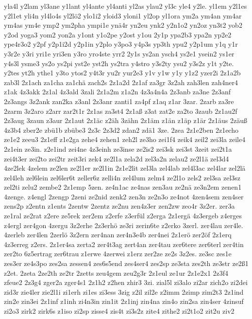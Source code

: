 {yla4l
y2lam
yl3ane
y1lant
yl4ante
yl4anti
yl2as
ylau2
yl3c
yle4
y2le.
yl1em
y2l1es
y2l1et
yli4n
yl4lo4s
yl2lö2
ylo1i2
yloid3
yloni1
yl2op
yl1ora
ym2a
ym4an
ym4ar
ym4as
ym4e
ymp2
ym2pha
ympi1e
ynä4r
yn2eu
ynk2
y2n1o2
yn2oz
yn3t2
yob2
y2od
yoga3
yom2
yon2a
y1ont
y1o2pe
y2ost
y1ou
2y1p
ypa2b3
ypa2n
yp2e2
ype4r3o2
y2pf
y2p1i2d
y2p1in
y2plo
y3po3
y4p3s
yp3th
ypu2
y2p1um
y1q
y1r
y3r2e
y3ri
yri1e
yri3en
y3ro
yro4ste
yrr2
2y1s
ys2an
ysch4
ys2e1
ysein2
ys1er
y4s3l
ysme3
ys2o
ys2pi
yst2e
yst2h
ys2tra
y4stro
y3s2ty
ysu2
y3s2z
y1t
y2te.
y2tes
yt2h
ythe1
y3to
ytos2
y4t3r
yu2r
yur2e3
y1v
y1w
y1y
y1z2
yzer2i
2z1a2b
zab3l
2z1ach
za1cha
za1chä
zach2s
2z1a2d
2z1af
za3gr
3z2ah
zah3len
zah4ner4
z1ak
4z3akk
2z1al
4z3ald
3zali
2z1a2m
z1a2n
4z3a4n4a
2z3anb
za3ne
2z3anf
2z3angs
3z2ank
zan2ka
z3anl
2z3anr
zanti1
za4pf
z1aq
z1ar
3zar.
2zarb
za3re
2zarm
3z2aro
z2arr
zar2t1r
2z1as
za3st4
2z1aß
z3at
zat2e
za2to
3zaub
2z1au2f
2z3aug
3zaun
z3aur
2z1aut
2z1äc
z2äh
3zähn
2z1äm
z1än
z1äp
z1är
2z1äus
2zäuß
4z3b4
zber2e
zbü1b
zbübe3
2z3c
2z3d2
zdan2
zdä1
3ze.
2zea
2z1e2ben
2z1echo
ze1e2
zeeu3
2z1eff
z1e2ga
zehe4
zehen1
zeh2l
ze3ho
zei1f4
zeik4
zeil2
zei3la
zeile4
2z1ein
ze3in.
z2e1ind
zei4ne
4z3einh
ze3inse
ze2is2
zei3sk
zei3st
3zeit
zei2t1a
zei4t3er
zei2to
zei2tr
zeit3ri
zek4
ze2l1a
zela2d
zel3a2n
zelau2
ze2l1ä
zel3d4
4ze2lek
4zelem
ze2len
ze2l1er
ze2l1in
2z1e2lit
zel3la
zel4lab
zel4l3ac
zel4lar
zel2lä
zel4leh
zel6lein
zel6ler6t
zeller6z
zelli4n
zel4lum
zelm4
ze2l1o
zels2
zel3sa
zel3sz
zel2ti
zelu2
zembe2
2z1emp
5zen.
ze4n1ac
ze4nas
zen3au
ze2nä
ze3n2em
zenen1
4zenge.
z4engl
2zengp
2zeni
ze2nid
zenk2
zen3n
ze2n3o
ze4not
4zen4sem
zen4ser
zens2p
z2entn
z1ents
2zentw
2zentz
ze2nu
zen4z3er
zen2zw
zeo4r
3z2er.
zer3a
ze1ral
ze2rat
z2ere
ze5rek
zer2em
z2erfe
z3erfül
z2erga
2z1ergä
4z3ergeb
z4erges
z4ergl
zer4gon
4zergu
3z2erhe
2z3erhö
ze3ri
zerin6te
z2erko
3zerl.
zer4lau
zer4le.
4zerleb
zer4len
2zerlö
3z2ern
zer4nan
zer4n3e4b
zer4nei
2z1erö
zer2öf
2z1erq
4z3erreg
z2ers.
2z1er4sa
zerta2
zer4t3ag
zert4an
zer4tau
zer6tere
zer6terl
zer4tin
zer2to
6z5ertrag
zer6trau
z1erwe
4zerwei
z1erz
zer2ze
ze2s
3z2es.
ze3sc
zes1e
zes3er
ze4s3po
zes2sa
zessen4
zes6s5end
zes4ser4
zes2sp
ze3sta
zes2th
ze3str
ze2ß1
z2et.
2zeta
2ze2th
ze2tr
2zetts
zeu4gem
zeu2g3r
2z1eul
ze1ur
2z1e2x1
2z3f4
zfeue2
2z3g4
zger2a
zger4s1
2z1h2
z2hen
zhir3
3zi.
zial5l
zi3alo
zi2ar
zich2o
zi2dei
zid3r
zie4ler
zie2l1i
zi1erh
zi1es
zi3ess
3zig
z2il
zil2e
z2imm
2zimp
zim2t3
2z1ind
zin2e
zin3ei
2z1inf
z1inh
zi4n3in
zin1it
2z1inj
zin4na
zin4o
zin2sa
zin4ser
4zinsuf
zi2o3
zirk2
zirk6s
z1iso
zi2sp
zisse4
zis4t
zi3s2z
zite4
zithe2
zi2t1o2
zit2u
ziv2
}
